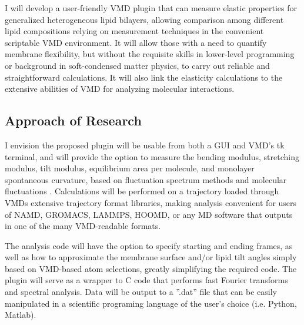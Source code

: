 \documentclass{article}
\begin{document}
I will develop a user-friendly VMD plugin that can measure elastic properties for generalized heterogeneous lipid bilayers, allowing comparison among different lipid compositions relying on measurement techniques in the convenient scriptable VMD environment. It will allow those with a need to quantify membrane flexibility, but without the requisite skills in lower-level programming or background in soft-condensed matter physics, to carry out reliable and straightforward calculations. It will also link the elasticity calculations to the extensive abilities of VMD for analyzing molecular interactions.

\subsection{Approach of Research}

I envision the proposed plugin will be usable from both a GUI and VMD’s tk terminal, and will provide the option to measure the bending modulus, stretching modulus, tilt modulus, equilibrium area per molecule, and monolayer spontaneous curvature, based on fluctuation spectrum methods \cite{Brannigan2006,Goetz1999} and molecular fluctuations \cite{Galimzyanov_Undulations_2017,Rawicz_Effect_2000,Pan_Effect_2009}. Calculations will be performed on a trajectory loaded through VMDs extensive trajectory format libraries, making analysis convenient for users of NAMD, GROMACS, LAMMPS, HOOMD, or any MD software that outputs in one of the many VMD-readable formats.

The analysis code will have the option to specify starting and ending frames, as well as how to approximate the membrane surface and/or lipid tilt angles simply based on VMD-based atom selections, greatly simplifying the required code. The plugin will serve as a wrapper to C code that performs fast Fourier transforms and spectral analysis. Data will be output to a ”.dat” file that can be easily manipulated in a scientific programing language of the user’s choice (i.e. Python, Matlab).
\end{document}
